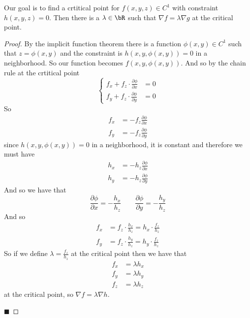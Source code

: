 \documentclass[10pt]{article}
\def\pdv#1#2{\frac{\partial #1}{\partial #2}}
\begin{document}


\bigskip

\begin{thrm*}

    Our goal is to find a crtitical point for $f(x,y,z)\in C^1$ with constraint $h(x,y,z)=0$.
    Then there is a $\lambda\in\bR$ such that $\nabla f=\lambda\nabla g$ at the critical point.

\end{thrm*}

\begin{proof}

    By the implicit function theorem there is a function $\phi(x,y)\in C^1$ such that $z=\phi(x,y)$ and the constraint is $h(x,y,\phi(x,y))=0$ in a neighborhood.
    So our function becomes $f(x,y,\phi(x,y))$.
    And so by the chain rule at the crtitical point
    \[ \left\{\begin{aligned} f_x + f_z\cdot\pdv\phi x &= 0 \\ f_y + f_z\cdot\pdv\phi y &= 0 \end{aligned}\right. \]
    So
    \begin{align*}
    f_x &= -f_z\pdv\phi x \\ 
    f_y &= -f_z\pdv\phi y
    \end{align*}
    since $h(x,y,\phi(x,y))=0$ in a neighborhood, it is constant and therefore we must have
    \begin{align*}
    h_x &= -h_z\pdv\phi x \\
    h_y &= -h_z\pdv\phi y
    \end{align*}
    And so we have that
    \[ \pdv\phi x = -\frac{h_x}{h_z} \qquad \pdv\phi y = -\frac{h_y}{h_z} \]
    And so
    \begin{align*}
    f_x &= f_z\cdot\frac{h_x}{h_z} = h_x\cdot\frac{f_z}{h_z} \\
    f_y &= f_z\cdot\frac{h_y}{h_z} = h_y\cdot\frac{f_z}{h_z}
    \end{align*}
    So if we define $\lambda=\frac{f_z}{h_z}$ at the critical point then we have that
    \begin{align*}
    f_x &= \lambda h_x \\
    f_y &= \lambda h_y \\
    f_z &= \lambda h_z
    \end{align*}
    at the critical point, so $\nabla f = \lambda\nabla h$.

    \hfill$\blacksquare$

\end{proof}
\end{document}

